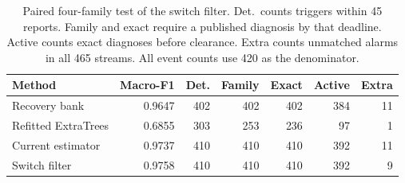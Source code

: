 \begin{table}[t]\centering\footnotesize
\caption{Paired four-family test of the switch filter. Det.\ counts triggers within 45 reports. Family and exact require a published diagnosis by that deadline. Active counts exact diagnoses before clearance. Extra counts unmatched alarms in all 465 streams. All event counts use 420 as the denominator.}
\label{tab:switch-trial}
\setlength{\tabcolsep}{2.3pt}
\begin{tabular}{lrrrrrr}\toprule
Method & Macro-F1 & Det. & Family & Exact & Active & Extra\\\midrule
Recovery bank & 0.9647 & 402 & 402 & 402 & 384 & 11 \\
Refitted ExtraTrees & 0.6855 & 303 & 253 & 236 & 97 & 1 \\
Current estimator & 0.9737 & 410 & 410 & 410 & 392 & 11 \\
Switch filter & 0.9758 & 410 & 410 & 410 & 392 & 9 \\
\bottomrule\end{tabular}\end{table}
